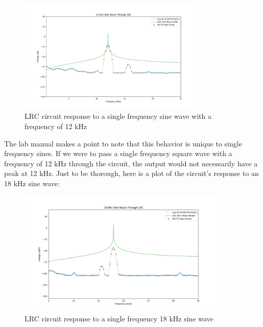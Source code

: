 \documentclass{article}
\begin{document}
\begin{figure}[H]
    \centering
\begin{minipage}{11cm}
\begin{tcolorbox}
    \centering
        \includegraphics[width=9cm, height=5.5cm]{figures/figure20.png}
        \caption{LRC circuit response to a single frequency sine wave with a
        frequency of 12 kHz}
        \label{fig:fig20}
\end{tcolorbox}
\end{minipage}
\end{figure}

The lab manual makes a point to note that this behavior is unique to single
frequency sines. If we were to pass a single frequency square wave with a
frequency of 12 kHz through the circuit, the output would not necessarily have
a peak at 12 kHz. Just to be thorough, here is a plot of the circuit's response
to an 18 kHz sine wave:

\begin{figure}[H]
    \centering
\begin{minipage}{11cm}
\begin{tcolorbox}
    \centering
        \includegraphics[width=10cm, height=6cm]{figures/figure21.png}
        \caption{LRC circuit response to a single frequency 18 kHz sine wave}
        \label{fig:fig21}
\end{tcolorbox}
\end{minipage}
\end{figure}
\end{document}
